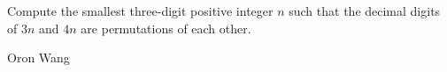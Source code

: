 Compute the smallest three-digit positive integer $n$ such that the decimal digits of $3n$ and $4n$ are permutations of each other.

Oron Wang
